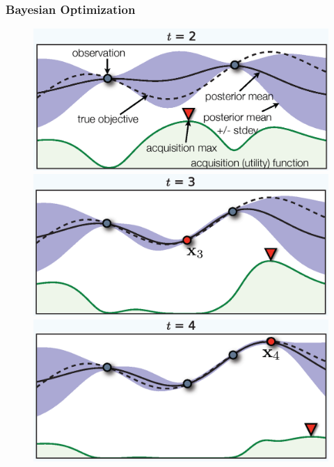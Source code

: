 \documentclass[grey]{beamer}
\begin{document}
 \begin{frame}
 \frametitle{Bayesian Optimization}
  \begin{figure}
  
   \begin{itemize}
   \begin{center}
    \item[]<1-> \includegraphics[width=0.48\columnwidth]{./figs/bo1}
    \item[]<2-> \includegraphics[width=0.48\columnwidth]{./figs/bo2}
    \item[]<3-> \includegraphics[width=0.48\columnwidth]{./figs/bo3}
    \end{center}
   \end{itemize}
  
  \end{figure}

 \end{frame}
\end{document}
